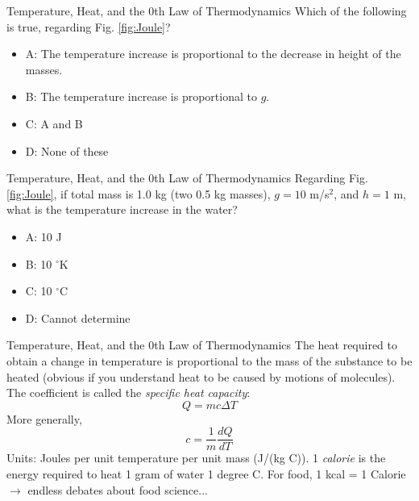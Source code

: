 \documentclass{beamer}
\begin{document}
\begin{frame}{Temperature, Heat, and the 0th Law of Thermodynamics}
Which of the following is true, regarding Fig. \ref{fig:Joule}?
\begin{itemize}
\item A: The temperature increase is proportional to the decrease in height of the masses.
\item B: The temperature increase is proportional to $g$.
\item C: A and B
\item D: None of these
\end{itemize}
\end{frame}

\begin{frame}{Temperature, Heat, and the 0th Law of Thermodynamics}
Regarding Fig. \ref{fig:Joule}, if total mass is 1.0 kg (two 0.5 kg masses), $g = 10$ m/s$^2$, and $h = 1$ m, what is the temperature increase in the water?
\begin{itemize}
\item A: 10 J
\item B: 10 $^{\circ}$K
\item C: 10 $^{\circ}$C
\item D: Cannot determine
\end{itemize}
\end{frame}

\begin{frame}{Temperature, Heat, and the 0th Law of Thermodynamics}
The heat required to obtain a change in temperature is proportional to the mass of the substance to be heated (obvious if you understand heat to be caused by motions of molecules).  The coefficient is called the \textit{specific heat capacity}:
\begin{equation}
Q = mc\Delta T
\end{equation}
More generally,
\begin{equation}
c = \frac{1}{m}\frac{dQ}{dT}
\end{equation}
Units: Joules per unit temperature per unit mass (J/(kg C)).  1 \textit{calorie} is the energy required to heat 1 gram of water 1 degree C.  For food, 1 kcal = 1 Calorie $\rightarrow$ endless debates about food science...
\end{frame}
\end{document}
